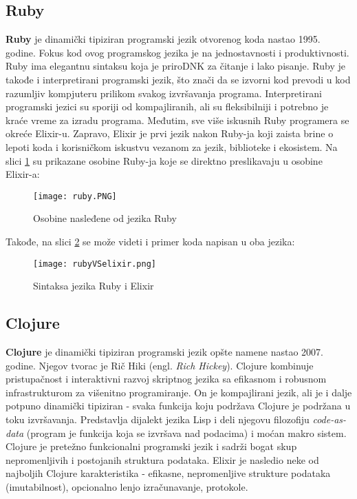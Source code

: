 \documentclass[12pt,oneside]{memoir}
\begin{document}
\subsection{Ruby}
\textbf{Ruby} je dinamički tipiziran programski jezik otvorenog koda nastao 1995. godine. Fokus kod ovog programskog jezika je na jednostavnosti i produktivnosti. Ruby ima elegantnu sintaksu koja je priroDNK za čitanje i lako pisanje.
Ruby je takođe i interpretirani programski jezik, što znači da se izvorni kod prevodi u kod razumljiv kompjuteru prilikom svakog izvršavanja programa. Interpretirani programski jezici su sporiji od kompajliranih, ali su fleksibilniji i potrebno je kraće vreme za izradu programa.
Međutim, sve više iskusnih Ruby programera se okreće Elixir-u. Zapravo, Elixir je prvi jezik nakon Ruby-ja koji zaista brine o lepoti koda i korisničkom iskustvu vezanom za jezik, biblioteke i ekosistem. Na slici \ref{fig:0} su prikazane osobine Ruby-ja koje se direktno preslikavaju u osobine Elixir-a:

\begin{figure}[!ht]
  \centering
  \texttt{[image: ruby.PNG]}
  \caption{Osobine nasleđene od jezika Ruby}
  \label{fig:0}
\end{figure}

Takođe, na slici \ref{fig:01} se može videti i primer koda napisan u oba jezika:

\begin{figure}[!ht]
  \centering
  \texttt{[image: rubyVSelixir.png]}
  \caption{Sintaksa jezika Ruby i Elixir}
  \label{fig:01}
\end{figure}

\subsection{Clojure}
\textbf{Clojure} je dinamički tipiziran programski jezik opšte namene nastao 2007. godine. Njegov tvorac je Rič Hiki (engl. \textit{Rich Hickey}). Clojure kombinuje pristupačnost i interaktivni razvoj skriptnog jezika sa efikasnom i robusnom infrastrukturom za višenitno programiranje. On je kompajlirani jezik, ali je i dalje potpuno dinamički tipiziran - svaka funkcija koju podržava Clojure je podržana u toku izvršavanja. Predstavlja dijalekt jezika Lisp i deli njegovu filozofiju \textit{code-as-data} (program je funkcija koja se izvršava nad podacima) i moćan makro sistem. Clojure je pretežno funkcionalni programski jezik i sadrži bogat skup nepromenljivih i postojanih struktura podataka. Elixir je nasledio neke od najboljih Clojure karakteristika - efikasne, nepromenljive strukture podataka (imutabilnost), opcionalno lenjo izračunavanje, protokole.
\newpage
\end{document}
